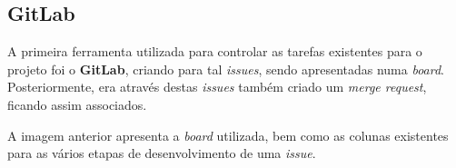 \subsection{GitLab}

A primeira ferramenta utilizada para controlar as tarefas existentes para o projeto foi o \textbf{GitLab}, criando para tal \textit{issues}, sendo apresentadas numa \textit{board}. Posteriormente, era através destas \textit{issues} também criado um \textit{merge request}, ficando assim associados.


A imagem anterior apresenta a \textit{board} utilizada, bem como as colunas existentes para as vários etapas de desenvolvimento de uma \textit{issue}.